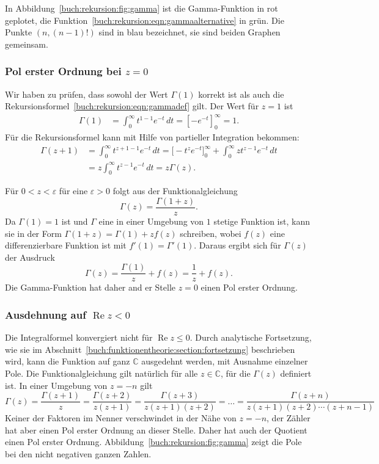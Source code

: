 In Abbildung~\ref{buch:rekursion:fig:gamma} ist die Gamma-Funktion
in rot geplotet, die Funktion~\eqref{buch:rekursion:eqn:gammaalternative}
in grün.
Die Punkte $(n,(n-1)!)$ sind in blau bezeichnet, sie sind beiden Graphen
gemeinsam.

\subsubsection{Pol erster Ordnung bei $z=0$}
Wir haben zu prüfen, dass sowohl der Wert $\Gamma(1)$ korrekt ist als
auch die Rekursionsformel~\eqref{buch:rekursion:eqn:gammadef} gilt.
Der Wert für $z=1$ ist
\begin{align*}
\Gamma(1)
&=
\int_0^\infty t^{1-1}e^{-t}\,dt
=
\left[ -e^{-t} \right]_0^\infty
=
1.
\end{align*}
Für die Rekursionsformel kann mit Hilfe von partieller Integration
bekommen:
\begin{align*}
\Gamma(z+1)
&=
\int_0^\infty t^{z+1-1}e^{-t}\,dt
=
\biggl[-t^{z}e^{-t}\biggr]_0^\infty
+
\int_0^\infty z t^{z-1}e^{-t}\,dt
\\
&=
z
\int_0^\infty
t^{z-1}e^{-t}\,dt
=
z \Gamma(z).
\end{align*}

Für $0<z<\varepsilon$ für eine $\varepsilon >0$ folgt aus der 
Funktionalgleichung
\[
\Gamma(z) = \frac{\Gamma(1+z)}{z}.
\]
Da $\Gamma(1)=1$ ist und $\Gamma$ eine in einer
Umgebung von $1$ stetige Funktion ist, kann sie in der Form
\(
\Gamma(1+z)=\Gamma(1) + zf(z)
\)
schreiben, wobei  $f(z)$ eine differenzierbare Funktion ist mit
$f'(1)=\Gamma'(1)$.
Daraus ergibt sich für $\Gamma(z)$ der Ausdruck
\[
\Gamma(z) = \frac{\Gamma(1)}{z} + f(z) = \frac{1}{z} + f(z).
\]
Die Gamma-Funktion hat daher and er Stelle $z=0$ einen Pol erster Ordnung.

\subsubsection{Ausdehnung auf $\operatorname{Re}z<0$}
Die Integralformel konvergiert nicht für $\operatorname{Re}z\le 0$.
Durch analytische Fortsetzung, wie sie im
Abschnitt~\ref{buch:funktionentheorie:section:fortsetzung}
beschrieben wird, kann die Funktion auf ganz $\mathbb{C}$ ausgedehnt
werden, mit Ausnahme einzelner Pole.
Die Funktionalgleichung gilt natürlich für alle $z\in\mathbb{C}$,
für die $\Gamma(z)$ definiert ist.
In einer Umgebung von $z=-n$ gilt
\[
\Gamma(z)
=
\frac{\Gamma(z+1)}{z}
=
\frac{\Gamma(z+2)}{z(z+1)}
=
\frac{\Gamma(z+3)}{z(z+1)(z+2)}
=
\dots
=
\frac{\Gamma(z+n)}{z(z+1)(z+2)\cdots(z+n-1)}
\]
Keiner der Faktoren im Nenner verschwindet in der Nähe von $z=-n$, der
Zähler hat aber einen Pol erster Ordnung an dieser Stelle.
Daher hat auch der Quotient einen Pol erster Ordnung.
Abbildung~\ref{buch:rekursion:fig:gamma} zeigt die Pole bei den
nicht negativen ganzen Zahlen.

